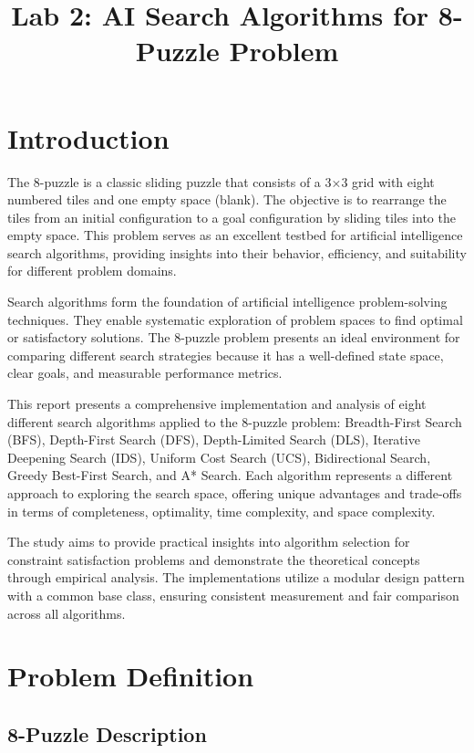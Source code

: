 \documentclass[11pt,a4paper]{article}
\title{Lab 2: AI Search Algorithms for 8-Puzzle Problem}
\date{}
\begin{document}
\maketitle

\section{Introduction}

The 8-puzzle is a classic sliding puzzle that consists of a 3×3 grid with eight numbered tiles and one empty space (blank). The objective is to rearrange the tiles from an initial configuration to a goal configuration by sliding tiles into the empty space. This problem serves as an excellent testbed for artificial intelligence search algorithms, providing insights into their behavior, efficiency, and suitability for different problem domains.

Search algorithms form the foundation of artificial intelligence problem-solving techniques. They enable systematic exploration of problem spaces to find optimal or satisfactory solutions. The 8-puzzle problem presents an ideal environment for comparing different search strategies because it has a well-defined state space, clear goals, and measurable performance metrics.

This report presents a comprehensive implementation and analysis of eight different search algorithms applied to the 8-puzzle problem: Breadth-First Search (BFS), Depth-First Search (DFS), Depth-Limited Search (DLS), Iterative Deepening Search (IDS), Uniform Cost Search (UCS), Bidirectional Search, Greedy Best-First Search, and A* Search. Each algorithm represents a different approach to exploring the search space, offering unique advantages and trade-offs in terms of completeness, optimality, time complexity, and space complexity.

The study aims to provide practical insights into algorithm selection for constraint satisfaction problems and demonstrate the theoretical concepts through empirical analysis. The implementations utilize a modular design pattern with a common base class, ensuring consistent measurement and fair comparison across all algorithms.

\section{Problem Definition}

\subsection{8-Puzzle Description}
\end{document}
